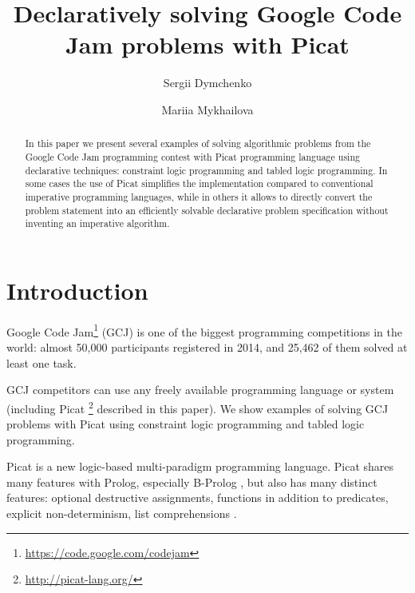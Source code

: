 \documentclass{llncs}
\begin{document}
\makeatletter
\newcommand*{\bdiv}{\nonscript\mskip-\medmuskip\mkern5mu\mathbin{\operator@font div}\penalty900\mkern5mu\nonscript\mskip-\medmuskip
}
\makeatother

\title{Declaratively solving Google Code Jam problems with Picat}

\author{Sergii Dymchenko  \and Mariia Mykhailova }


\maketitle

\begin{abstract}
In this paper we present several examples of solving algorithmic problems from the Google Code Jam programming contest
with Picat programming language using declarative techniques: constraint logic programming and tabled logic programming.
In some cases the use of Picat simplifies the implementation compared to conventional imperative programming languages,
while in others it allows to directly convert the problem statement into an efficiently solvable declarative problem specification without inventing an imperative algorithm.
\end{abstract}



\section{Introduction}
Google Code Jam\footnote{\url{https://code.google.com/codejam}} (GCJ) is one of the
biggest programming competitions in the world: almost 50,000 participants registered in 2014, and 25,462 of them solved at least one task.

GCJ competitors can use any freely available programming language or system (including Picat \footnote{\url{http://picat-lang.org/}} described in this paper).
We show examples of solving GCJ problems with Picat using constraint logic programming and tabled logic programming.

Picat is a new logic-based multi-paradigm programming language. Picat shares many features with Prolog, especially B-Prolog \cite{zhou2012bprolog},
but also has many distinct features: optional destructive assignments, functions in addition to predicates, explicit non-determinism, list comprehensions \cite{zhou2014picat}.
\end{document}
